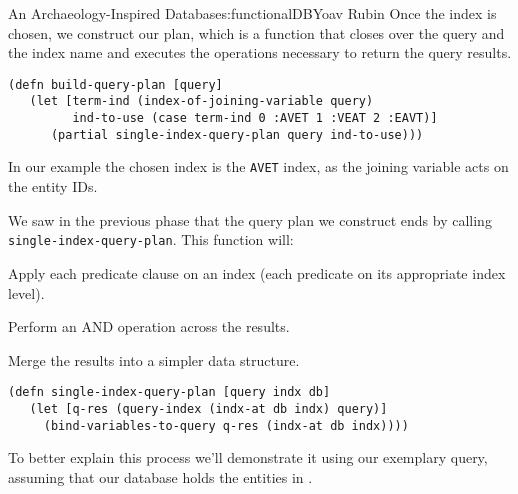 \begin{aosachapter}{An Archaeology-Inspired Database}{s:functionalDB}{Yoav Rubin}
Once the index is chosen, we construct our plan, which is a function
that closes over the query and the index name and executes the
operations necessary to return the query results.

\begin{verbatim}
(defn build-query-plan [query]
   (let [term-ind (index-of-joining-variable query)
         ind-to-use (case term-ind 0 :AVET 1 :VEAT 2 :EAVT)]
      (partial single-index-query-plan query ind-to-use)))
\end{verbatim}

In our example the chosen index is the \texttt{AVET} index, as the
joining variable acts on the entity IDs.

\label{phase-3-execution-of-the-plan}

We saw in the previous phase that the query plan we construct ends by
calling \texttt{single-index-query-plan}. This function will:

\begin{aosaenumerate}
\def\labelenumi{\arabic{enumi}.}

\item
  Apply each predicate clause on an index (each predicate on its
  appropriate index level).
\item
  Perform an AND operation across the results.
\item
  Merge the results into a simpler data structure.
\end{aosaenumerate}

\begin{verbatim}
(defn single-index-query-plan [query indx db]
   (let [q-res (query-index (indx-at db indx) query)]
     (bind-variables-to-query q-res (indx-at db indx))))
\end{verbatim}

To better explain this process we'll demonstrate it using our exemplary
query, assuming that our database holds the entities in
.


\end{aosachapter}
